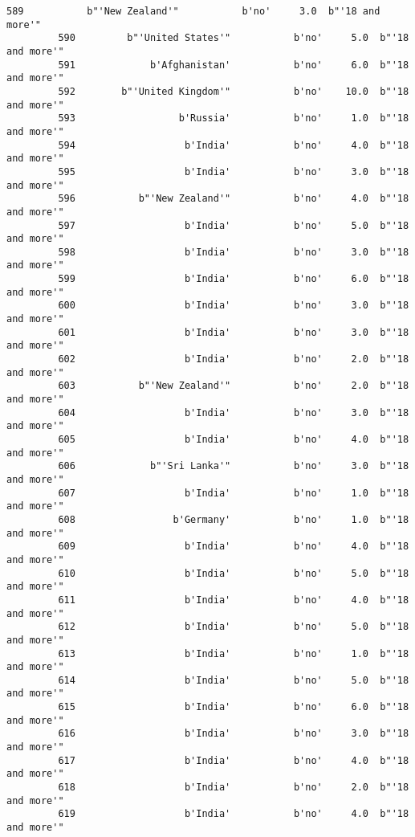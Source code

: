 \documentclass[11pt]{article}
\begin{document}
\begin{Verbatim}[commandchars=\\\{\}]
         589           b"'New Zealand'"           b'no'     3.0  b"'18 and more'"   
         590         b"'United States'"           b'no'     5.0  b"'18 and more'"   
         591             b'Afghanistan'           b'no'     6.0  b"'18 and more'"   
         592        b"'United Kingdom'"           b'no'    10.0  b"'18 and more'"   
         593                  b'Russia'           b'no'     1.0  b"'18 and more'"   
         594                   b'India'           b'no'     4.0  b"'18 and more'"   
         595                   b'India'           b'no'     3.0  b"'18 and more'"   
         596           b"'New Zealand'"           b'no'     4.0  b"'18 and more'"   
         597                   b'India'           b'no'     5.0  b"'18 and more'"   
         598                   b'India'           b'no'     3.0  b"'18 and more'"   
         599                   b'India'           b'no'     6.0  b"'18 and more'"   
         600                   b'India'           b'no'     3.0  b"'18 and more'"   
         601                   b'India'           b'no'     3.0  b"'18 and more'"   
         602                   b'India'           b'no'     2.0  b"'18 and more'"   
         603           b"'New Zealand'"           b'no'     2.0  b"'18 and more'"   
         604                   b'India'           b'no'     3.0  b"'18 and more'"   
         605                   b'India'           b'no'     4.0  b"'18 and more'"   
         606             b"'Sri Lanka'"           b'no'     3.0  b"'18 and more'"   
         607                   b'India'           b'no'     1.0  b"'18 and more'"   
         608                 b'Germany'           b'no'     1.0  b"'18 and more'"   
         609                   b'India'           b'no'     4.0  b"'18 and more'"   
         610                   b'India'           b'no'     5.0  b"'18 and more'"   
         611                   b'India'           b'no'     4.0  b"'18 and more'"   
         612                   b'India'           b'no'     5.0  b"'18 and more'"   
         613                   b'India'           b'no'     1.0  b"'18 and more'"   
         614                   b'India'           b'no'     5.0  b"'18 and more'"   
         615                   b'India'           b'no'     6.0  b"'18 and more'"   
         616                   b'India'           b'no'     3.0  b"'18 and more'"   
         617                   b'India'           b'no'     4.0  b"'18 and more'"   
         618                   b'India'           b'no'     2.0  b"'18 and more'"   
         619                   b'India'           b'no'     4.0  b"'18 and more'"   

\end{Verbatim}
\end{document}
